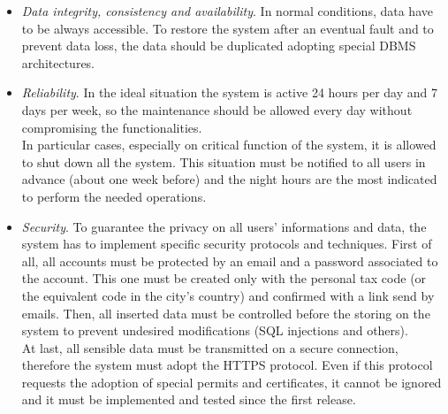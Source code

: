 \begin{itemize}
	\item \textit{Data integrity, consistency and availability}. In normal conditions, data have to be always accessible. To restore the system after an eventual fault and to prevent data loss, the data should be duplicated adopting special DBMS architectures.

	\item \textit{Reliability}. In the ideal situation the system is active 24 hours per day and 7 days per week, so the maintenance should be allowed every day without compromising the functionalities.\\
In particular cases, especially on critical function of the system, it is allowed to shut down all the system. This situation must be notified to all \glspl{user} in advance (about one week before) and the night hours are the most indicated to perform the needed operations.

	\item \textit{Security}. To guarantee the privacy on all users' informations and data, the system has to implement specific security protocols and techniques.
First of all, all accounts must be protected by an email and a password associated to the account. This one must be created only with the personal tax code (or the equivalent code in the city's country) and confirmed with a link send by emails. Then, all inserted data must be controlled before the storing on the system to prevent undesired modifications (SQL injections and others).\\
At last, all sensible data must be transmitted on a secure connection, therefore the system must adopt the HTTPS protocol. Even if this protocol requests the adoption of special permits and certificates, it cannot be ignored and it must be implemented and tested since the first release.


\end{itemize}

\acresetall